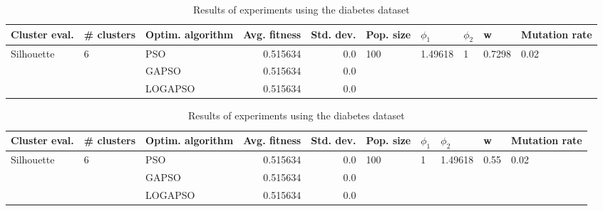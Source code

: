\documentclass{article}
\begin{document}
\begin{table}
\centering
\caption{Results of experiments using the diabetes dataset}
\begin{tabular}{lllrrlllll}
\toprule
              Cluster eval. &        \# clusters & Optim. algorithm &  Avg. fitness &  Std. dev. &            Pop. size &               $\phi_{1}$ &         $\phi_{2}$ &                       w &         Mutation rate \\
\midrule
\multirow{3}{*}{Silhouette} & \multirow{3}{*}{6} &              PSO &      0.515634 &        0.0 & \multirow{3}{*}{100} & \multirow{3}{*}{1.49618} & \multirow{3}{*}{1} & \multirow{3}{*}{0.7298} & \multirow{3}{*}{0.02} \\
                            &                    &            GAPSO &      0.515634 &        0.0 &                      &                          &                    &                         &                       \\
                            &                    &          LOGAPSO &      0.515634 &        0.0 &                      &                          &                    &                         &                       \\
\bottomrule
\end{tabular}
\end{table}
\begin{table}
\centering
\caption{Results of experiments using the diabetes dataset}
\begin{tabular}{lllrrlllll}
\toprule
              Cluster eval. &        \# clusters & Optim. algorithm &  Avg. fitness &  Std. dev. &            Pop. size &         $\phi_{1}$ &               $\phi_{2}$ &                     w &         Mutation rate \\
\midrule
\multirow{3}{*}{Silhouette} & \multirow{3}{*}{6} &              PSO &      0.515634 &        0.0 & \multirow{3}{*}{100} & \multirow{3}{*}{1} & \multirow{3}{*}{1.49618} & \multirow{3}{*}{0.55} & \multirow{3}{*}{0.02} \\
                            &                    &            GAPSO &      0.515634 &        0.0 &                      &                    &                          &                       &                       \\
                            &                    &          LOGAPSO &      0.515634 &        0.0 &                      &                    &                          &                       &                       \\
\bottomrule
\end{tabular}
\end{table}
\end{document}
